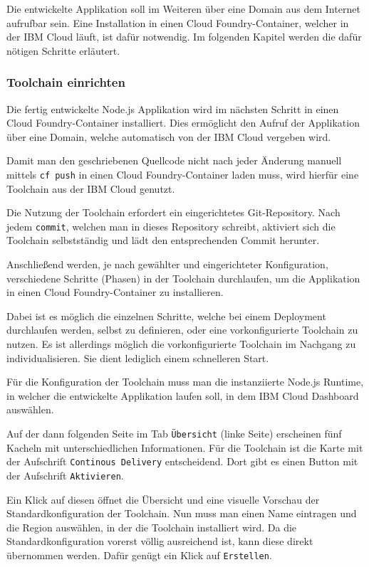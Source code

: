 Die entwickelte Applikation soll im Weiteren über eine Domain aus dem Internet aufrufbar sein. Eine Installation in
einen Cloud Foundry-Container, welcher in der IBM Cloud läuft, ist dafür notwendig. Im folgenden Kapitel werden die dafür
nötigen Schritte erläutert.

\subsubsection{Toolchain einrichten}
\label{sub:tollchain_einrichten}
Die fertig entwickelte Node.js Applikation wird im nächsten Schritt in einen Cloud Foundry-Container installiert. Dies
ermöglicht den Aufruf der Applikation über eine Domain, welche automatisch von der IBM Cloud vergeben wird.

Damit man den geschriebenen Quellcode nicht nach jeder Änderung manuell mittels \texttt{cf push} in einen Cloud
Foundry-Container laden muss, wird hierfür eine Toolchain aus der IBM Cloud genutzt.

Die Nutzung der Toolchain erfordert ein eingerichtetes Git-Repository. Nach jedem \texttt{commit}, welchen man in dieses
Repository schreibt, aktiviert sich die Toolchain selbstständig und lädt den entsprechenden Commit herunter.

Anschließend werden, je nach gewählter und eingerichteter Konfiguration, verschiedene Schritte (Phasen) in der Toolchain
durchlaufen, um die Applikation in einen Cloud Foundry-Container zu installieren.

Dabei ist es möglich die einzelnen Schritte, welche bei einem Deployment durchlaufen werden, selbst zu definieren, oder
eine vorkonfigurierte Toolchain zu nutzen. Es ist allerdings möglich die vorkonfigurierte Toolchain im Nachgang zu
individualisieren. Sie dient lediglich einem schnelleren Start.

Für die Konfiguration der Toolchain muss man die instanziierte Node.js Runtime, in welcher die entwickelte Applikation
laufen soll, in dem IBM Cloud Dashboard auswählen.

Auf der dann folgenden Seite im Tab \texttt{Übersicht} (linke Seite) erscheinen fünf Kacheln mit unterschiedlichen
Informationen. Für die Toolchain ist die Karte mit der Aufschrift \texttt{Continous Delivery} entscheidend. Dort gibt es
einen Button mit der Aufschrift \texttt{Aktivieren}.

Ein Klick auf diesen öffnet die Übersicht und eine visuelle Vorschau der Standardkonfiguration der Toolchain. Nun muss
man einen Name eintragen und die Region auswählen, in der die Toolchain installiert wird. Da die Standardkonfiguration
vorerst völlig ausreichend ist, kann diese direkt übernommen werden. Dafür genügt ein Klick auf \texttt{Erstellen}.

